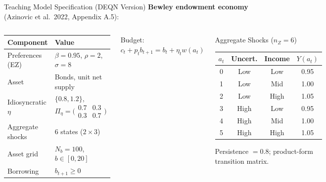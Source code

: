 \documentclass[aspectratio=169,11pt]{beamer}
\begin{document}
\begin{frame}{Teaching Model Specification (DEQN Version)}
\small
\textbf{Bewley endowment economy} (Azinovic et al.\ 2022, Appendix A.5):

\vspace{0.1em}
\begin{columns}[T]
\scriptsize
\begin{center}
\renewcommand{\arraystretch}{1.1}
\begin{tabular}{ll}
\toprule
\textbf{Component} & \textbf{Value} \\
\midrule
Preferences (EZ) & $\beta=0.95$, $\rho=2$, $\sigma=8$ \\
Asset & Bonds, unit net supply \\
Idiosyncratic $\eta$ & $\{0.8,1.2\}$, $\Pi_\eta=\bigl(\begin{smallmatrix}0.7&0.3\\0.3&0.7\end{smallmatrix}\bigr)$ \\
Aggregate shocks & 6 states ($2{\times}3$) \\
Asset grid & $N_b=100$, $b\in[0,20]$ \\
Borrowing & $b_{t+1}\geq 0$ \\
\bottomrule
\end{tabular}
\end{center}
Budget: $c_t + p_t b_{t+1} = b_t + \eta_t w(a_t)$

\begin{block}{Aggregate Shocks ($n_Z=6$)}
\footnotesize
\renewcommand{\arraystretch}{1.0}
\begin{tabular}{cccc}
\toprule
$a_t$ & Uncert. & Income & $Y(a_t)$ \\
\midrule
0 & Low  & Low  & 0.95 \\
1 & Low  & Mid  & 1.00 \\
2 & Low  & High & 1.05 \\
3 & High & Low  & 0.95 \\
4 & High & Mid  & 1.00 \\
5 & High & High & 1.05 \\
\bottomrule
\end{tabular}
\vspace{1pt}
{\tiny Persistence $=0.8$; product-form transition matrix.}
\end{block}
\end{columns}
\end{frame}
\end{document}
